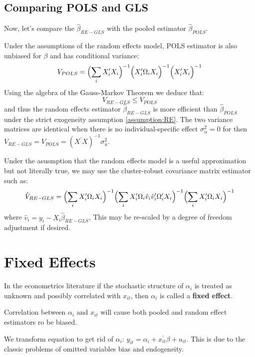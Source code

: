 \subsection{Comparing POLS and GLS}

Now, let's compare the $\hat{\beta}_{RE-GLS}$ with the pooled estimator $\hat{\beta}_{POLS}$.

Under the assumptions of the random effects model, POLS estimator is also unbiased for $\beta$ and has conditional variance:
\begin{gather*}
    V_{POLS} = \Bigl(\sum_{i} X_i^{\prime} X_i \Bigr)^{-1} \Bigl( X_i^{\prime} \Omega_i X_i \Bigr)^{-1} \Bigl( X_i^{\prime} X_i \Bigr)^{-1} 
\end{gather*}
Using the algebra of the Gauss-Markov Theorem we deduce that:
\[V_{RE-GLS} \leq V_{POLS} \]
and thus the random effects estimator $\hat{\beta}_{RE-GLS}$ is more efficient than $\hat{\beta}_{POLS} $ under the strict exogeneity assumption \ref{assumption:RE}.
The two variance matrices are identical when there is no individual-specific effect $\sigma_{\alpha}^2 = 0$ for then $V_{RE-GLS} = V_{POLS} = \left(X^{\prime} X\right)^{-1} \sigma_u^2.$

Under the asusmption that the random effects model is a useful approximation but not literally true, 
we may use the cluster-robust covariance matrix estimator such as:
\begin{gather*}
    \hat{V}_{RE-GLS} = \Bigl(\sum_{i} X_i^{\prime} \Omega_i X_i\Bigr)^{-1} \Bigl( \sum_{i} X_i^{\prime} \Omega_i \hat{v}_i \hat{v}_i^{\prime} \Omega_i^{\prime} X_i \Bigr)^{-1} \Bigl( \sum_{i} X_i^{\prime} \Omega_i X_i \Bigr)^{-1} 
\end{gather*}
where $\hat{v}_i = y_i - X_i \hat{\beta}_{RE-GLS}$, This may be re-scaled by a degree of freedom adjustment if desired.

\section{Fixed Effects}
In the econometrics literature if the stochastic structure of $\alpha_i$ is treated as unknown
and possibly correlated with $x_{it}$, then $\alpha_i$ is called a \textbf{fixed effect}.

Correlation between $\alpha_i$ and $x_{it}$ will cause both pooled and random effect estimators ro be biased.

We transform equation to get rid of $\alpha_i$: $y_{it} = \alpha_i + x_{it}^{\prime} \beta + u_{it}.$
This is due to the classic problems of omitted variables bias and endogeneity. 

